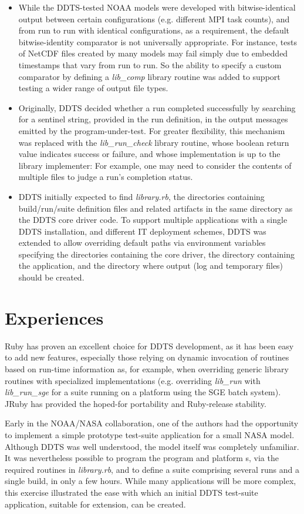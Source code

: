\documentclass[conference]{IEEEtran}
\begin{document}
\begin{itemize}
\item While the DDTS-tested NOAA models were developed with bitwise-identical output between certain configurations (e.g. different MPI task counts), and from run to run with identical configurations, as a requirement, the default bitwise-identity comparator is not universally appropriate. For instance, tests of NetCDF files created by many models may fail simply due to embedded timestamps that vary from run to run. So the ability to specify a custom comparator by defining a \emph{lib\_comp} library routine was added to support testing a wider range of output file types.
\item Originally, DDTS decided whether a run completed successfully by searching for a sentinel string, provided in the run definition, in the output messages emitted by the program-under-test. For greater flexibility, this mechanism was replaced with the \emph{lib\_run\_check} library routine, whose boolean return value indicates success or failure, and whose implementation is up to the library implementer: For example, one may need to consider the contents of multiple files to judge a run's completion status.
\item DDTS initially expected to find \emph{library.rb}, the directories containing build/run/suite definition files and related artifacts in the same directory as the DDTS core driver code. To support multiple applications with a single DDTS installation, and different IT deployment schemes, DDTS was extended to allow overriding default paths via environment variables specifying the directories containing the core driver, the directory containing the application, and the directory where output (log and temporary files) should be created.
\end{itemize}

\section{Experiences}

Ruby has proven an excellent choice for DDTS development, as it has been easy to add new features, especially those relying on dynamic invocation of routines based on run-time information as, for example, when overriding generic library routines with specialized implementations (e.g. overriding \emph{lib\_run} with \emph{lib\_run\_sge} for a suite running on a platform using the SGE batch system). JRuby has provided the hoped-for portability and Ruby-release stability.

Early in the NOAA/NASA collaboration, one of the authors had the opportunity to implement a simple prototype test-suite application for a small NASA model. Although DDTS was well understood, the model itself was completely unfamiliar. It was nevertheless possible to program the program and platform s, via the required routines in \emph{library.rb}, and to define a suite comprising several runs and a single build, in only a few hours. While many applications will be more complex, this exercise illustrated the ease with which an initial DDTS test-suite application, suitable for extension, can be created.
\end{document}
